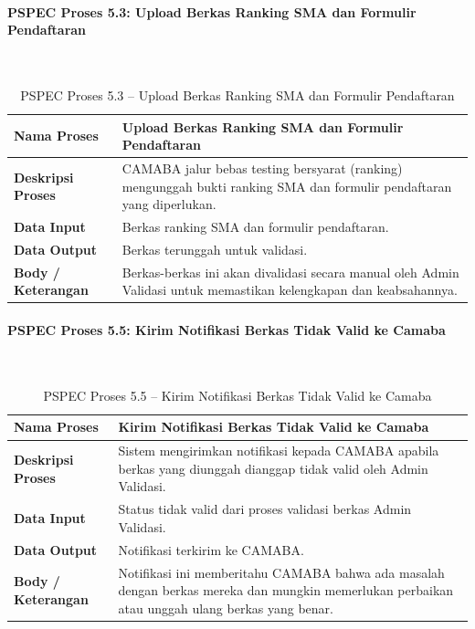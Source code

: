 \paragraph{PSPEC Proses 5.3: Upload Berkas Ranking SMA dan Formulir Pendaftaran}~\\
\begin{longtable}{|p{}|p{}|}
	\caption{PSPEC Proses 5.3 -- Upload Berkas Ranking SMA dan Formulir Pendaftaran}
	\label{table:3.pspec53}\\
	\hline
	\textbf{Nama Proses} & Upload Berkas Ranking SMA dan Formulir Pendaftaran \\
	\hline
	\textbf{Deskripsi Proses} & CAMABA jalur bebas testing bersyarat (ranking) mengunggah bukti ranking SMA dan formulir pendaftaran yang diperlukan. \\
	\hline
	\textbf{Data Input} & Berkas ranking SMA dan formulir pendaftaran. \\
	\hline
	\textbf{Data Output} & Berkas terunggah untuk validasi. \\
	\hline
	\textbf{Body / Keterangan} & Berkas-berkas ini akan divalidasi secara manual oleh Admin Validasi untuk memastikan kelengkapan dan keabsahannya. \\
	\hline
\end{longtable}

\paragraph{PSPEC Proses 5.5: Kirim Notifikasi Berkas Tidak Valid ke Camaba}~\\
\begin{longtable}{|p{}|p{}|}
	\caption{PSPEC Proses 5.5 -- Kirim Notifikasi Berkas Tidak Valid ke Camaba}
	\label{table:3.pspec55}\\
	\hline
	\textbf{Nama Proses} & Kirim Notifikasi Berkas Tidak Valid ke Camaba \\
	\hline
	\textbf{Deskripsi Proses} & Sistem mengirimkan notifikasi kepada CAMABA apabila berkas yang diunggah dianggap tidak valid oleh Admin Validasi. \\
	\hline
	\textbf{Data Input} & Status tidak valid dari proses validasi berkas Admin Validasi. \\
	\hline
	\textbf{Data Output} & Notifikasi terkirim ke CAMABA. \\
	\hline
	\textbf{Body / Keterangan} & Notifikasi ini memberitahu CAMABA bahwa ada masalah dengan berkas mereka dan mungkin memerlukan perbaikan atau unggah ulang berkas yang benar. \\
	\hline
\end{longtable}


